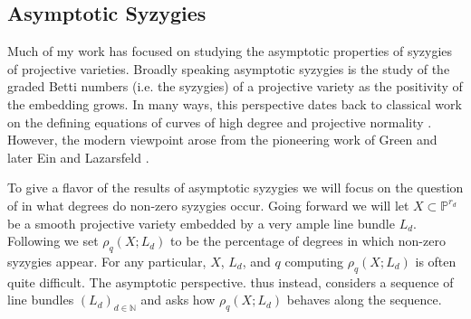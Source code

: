 \documentclass[11pt,reqno]{amsart}
\newtheorem{theorem}[lemma]{Theorem}
\theoremstyle{remark}
\newcommand{\N}{\mathbb{N}}
\renewcommand{\P}{\mathbb{P}}
\begin{document}

\subsection{Asymptotic Syzygies}

Much of my work has focused on studying the asymptotic properties of syzygies of projective varieties. Broadly speaking asymptotic syzygies is the study of the graded Betti numbers (i.e. the syzygies) of a projective variety as the positivity of the embedding grows. In many ways, this perspective dates back to classical work on the defining equations of curves of high degree and projective normality \cite{mumford66, mumford70}. However, the modern viewpoint arose from the pioneering work of Green \cite{green84-I, green84-II} and later Ein and Lazarsfeld \cite{einLazarsfeld12}. 

To give a flavor of the results of asymptotic syzygies we will focus on the question of in what degrees do non-zero syzygies occur. Going forward we will let $X\subset \P^{r_{d}}$ be a smooth projective variety embedded by a very ample line bundle $L_{d}$. Following \cite{ermanYang18} we set $\rho_q\left(X;L_{d}\right)$ to be the percentage of degrees in which non-zero syzygies appear. For any particular, $X$, $L_{d}$, and $q$ computing $\rho_{q}(X;L_{d})$ is often quite difficult. The asymptotic perspective. thus instead, considers a sequence of line bundles $(L_{d})_{d\in \N}$ and asks how $\rho_{q}(X;L_{d})$ behaves along the sequence. 
\end{document}
